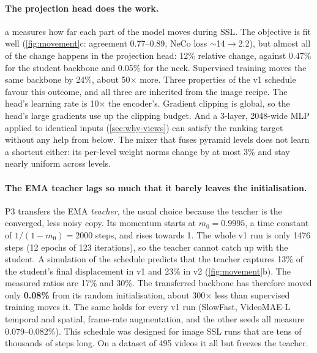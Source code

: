 \documentclass[10pt,a4paper]{article}
\begin{document}
\paragraph{The projection head does the work.} a measures how far each
part of the model moves during SSL. The objective is fit well (\cref{fig:movement}c:
agreement 0.77--0.89, NeCo loss $\sim$14$\rightarrow$2.2), but almost all of the change
happens in the projection head: 12\% relative change, against 0.47\% for the student
backbone and 0.05\% for the neck. Supervised training moves the same backbone by 24\%,
about 50$\times$ more. Three properties of the v1 schedule favour this outcome, and all
three are inherited from the image recipe. The head's learning rate is 10$\times$ the
encoder's. Gradient clipping is global, so the head's large gradients use up the clipping
budget. And a 3-layer, 2048-wide MLP applied to identical inputs (\cref{sec:why-views})
can satisfy the ranking target without any help from below. The mixer that fuses
pyramid levels does not learn a shortcut either: its per-level weight norms change by at
most 3\% and stay nearly uniform across levels.

\paragraph{The EMA teacher lags so much that it barely leaves the initialisation.} P3
transfers the EMA \emph{teacher}, the usual choice because the teacher is the converged,
less noisy copy. Its momentum starts at $m_0=0.9995$, a time constant of
$1/(1-m_0)=2000$ steps, and rises towards 1. The whole v1 run is only 1476 steps (12 epochs
of 123 iterations), so the teacher cannot catch up with the student. A simulation of the
schedule predicts that the teacher captures 13\% of the student's final displacement in
v1 and 23\% in v2 (\cref{fig:movement}b). The measured ratios are 17\% and 30\%. The
transferred backbone has therefore moved only \textbf{0.08\%} from its random
initialisation, about 300$\times$ less than supervised training moves it. The same
holds for every v1 run (SlowFast, VideoMAE-L temporal and spatial, frame-rate augmentation,
and the other seeds all measure 0.079--0.082\%). This schedule was designed for image
SSL runs that are tens of thousands of steps long. On a dataset of 495 videos it all but
freezes the teacher.
\end{document}
